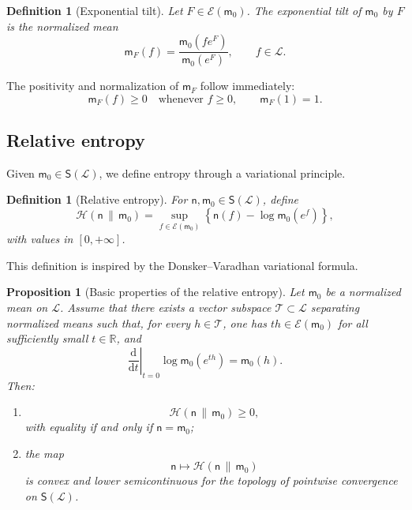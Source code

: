 \documentclass[11pt,reqno]{amsart}
\newtheorem{Proposition}[Theorem]{Proposition}
\newtheorem{Definition}[Theorem]{Definition}
\begin{document}
\begin{Definition}[Exponential tilt]
\label{def:exponential-tilt}
Let $F\in\mathcal E(\mathsf m_0)$. The exponential tilt of
$\mathsf m_0$ by $F$ is the normalized mean
\[
\mathsf m_F(f)
=
\frac{\mathsf m_0(fe^F)}{\mathsf m_0(e^F)},
\qquad
f\in\mathcal L.
\]
\end{Definition}

The positivity and normalization of $\mathsf m_F$ follow immediately:
\[
\mathsf m_F(f)\geq 0
\quad\text{whenever }f\geq 0,
\qquad
\mathsf m_F(1)=1.
\]

\subsection{Relative entropy}

Given $\mathsf m_0\in\mathsf S(\mathcal L)$, we define entropy through a
variational principle.

\begin{Definition}[Relative entropy]
\label{def:entropy}
For $\mathsf n,\mathsf m_0\in\mathsf S(\mathcal L)$, define
\[
\mathcal H(\mathsf n\,\|\,\mathsf m_0)
=
\sup_{f\in\mathcal E(\mathsf m_0)}
\left\{
\mathsf n(f)-\log\mathsf m_0(e^f)
\right\},
\]
with values in $[0,+\infty]$.
\end{Definition}

This definition is inspired by the Donsker--Varadhan variational
formula.

\begin{Proposition}[Basic properties of the relative entropy]
\label{prop:entropy-properties}
Let $\mathsf m_0$ be a normalized mean on $\mathcal L$. Assume that
there exists a vector subspace $\mathcal T\subset\mathcal L$ separating
normalized means such that, for every $h\in\mathcal T$, one has
$th\in\mathcal E(\mathsf m_0)$ for all sufficiently small
$t\in\mathbb R$, and
\[
\left.\frac{\mathrm d}{\mathrm dt}\right|_{t=0}
\log\mathsf m_0(e^{th})
=
\mathsf m_0(h).
\]
Then:
\begin{enumerate}
\item
\[
\mathcal H(\mathsf n\,\|\,\mathsf m_0)\geq 0,
\]
with equality if and only if $\mathsf n=\mathsf m_0$;
\item the map
\[
\mathsf n\longmapsto
\mathcal H(\mathsf n\,\|\,\mathsf m_0)
\]
is convex and lower semicontinuous for the topology of pointwise
convergence on $\mathsf S(\mathcal L)$.
\end{enumerate}
\end{Proposition}
\end{document}
